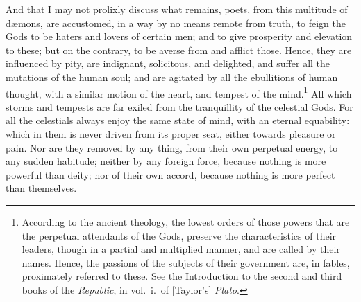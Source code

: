 \documentclass{article}
\begin{document}
\noindent And that I may not prolixly discuss what remains, poets, from this
multitude of d{\ae}mons, are accustomed, in a way by no means remote from
truth, to feign the Gods to be haters and lovers of certain men; and to give
prosperity and elevation to these; but on the contrary, to be averse from and
afflict those. Hence, they are influenced by pity, are indignant, solicitous,
and delighted, and suffer all the mutations of the human soul; and are agitated
by all the ebullitions of human thought, with a similar motion of the heart,
and tempest of the mind.\footnote{According to the ancient theology, the lowest
orders of those powers that are the perpetual attendants of the Gods, preserve
the characteristics of their leaders, though in a partial and multiplied
manner, and are called by their names. Hence, the passions of the subjects of
their government are, in fables, proximately referred to these. See the
Introduction to the second and third books of the \textit{Republic}, in
vol.~i.~of [Taylor's] \textit{Plato}.} All which storms and tempests are far
exiled from the tranquillity of the celestial Gods. For all the celestials
always enjoy the same state of mind, with an eternal equability: which in them
is never driven from its proper seat, either towards pleasure or pain. Nor are
they removed by any thing, from their own perpetual energy, to any sudden
habitude; neither by any foreign force, because nothing is more powerful than
deity; nor of their own accord, because nothing is more perfect than
themselves.
\end{document}
